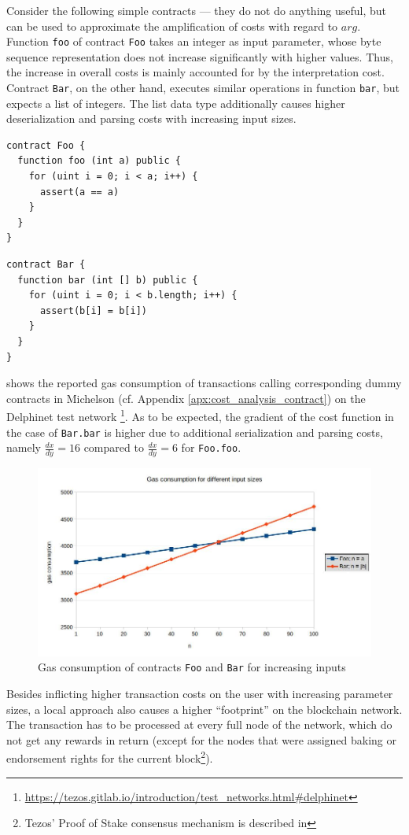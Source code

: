 Consider the following simple contracts --- they do not do anything useful, but can be used to approximate the amplification of costs with regard to $arg$. Function \texttt{foo} of contract \texttt{Foo} takes an integer as input parameter, whose byte sequence representation does not increase significantly with higher values. Thus, the increase in overall costs is mainly accounted for by the interpretation cost. Contract \texttt{Bar}, on the other hand, executes similar operations in function \texttt{bar}, but expects a list of integers. The list data type additionally causes higher deserialization and parsing costs with increasing input sizes. 
\begin{lstlisting}[numbers=none, language=Solidity, caption=Simple dummy contract executing a loop]
contract Foo {
  function foo (int a) public {
    for (uint i = 0; i < a; i++) {
      assert(a == a)
    }
  }
}
\end{lstlisting}
\begin{lstlisting}[numbers=none, language=Solidity, caption=Simple dummy contract iterating over a list]
contract Bar {
  function bar (int [] b) public {
    for (uint i = 0; i < b.length; i++) {
      assert(b[i] = b[i])
    }
  }
}
\end{lstlisting}

 shows the reported gas consumption of transactions calling corresponding dummy contracts in Michelson (cf. Appendix \ref{apx:cost_analysis_contract}) on the Delphinet test network \footnote{\url{https://tezos.gitlab.io/introduction/test_networks.html\#delphinet}}. As to be expected, the gradient of the cost function in the case of \texttt{Bar.bar} is higher due to additional serialization and parsing costs, namely $\frac{dx}{dy} = 16$ compared to $\frac{dx}{dy} = 6$ for \texttt{Foo.foo}.
\begin{figure}[h]
\centering
\includegraphics[width=0.9\linewidth]{figures/2-use_cases/cost_analysis}
\caption{Gas consumption of contracts \texttt{Foo} and \texttt{Bar} for increasing inputs}
\label{fig:use_case_cost}
\end{figure}

Besides inflicting higher transaction costs on the user with increasing parameter sizes, a local approach also causes a higher ``footprint'' on the blockchain network. The transaction has to be processed at every full node of the network, which do not get any rewards in return (except for the nodes that were assigned baking or endorsement rights for the current block\footnote{Tezos' Proof of Stake consensus mechanism is described in }).
